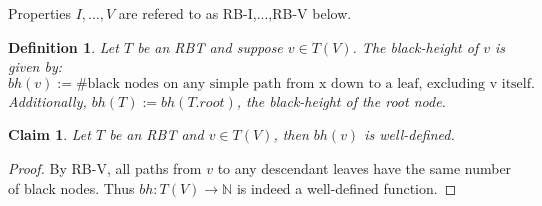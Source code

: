 \documentclass[10pt]{article}
\newtheorem{definition}{Definition}[section]
\newtheorem{claim}{Claim}[section]
\begin{document}
Properties $I,\ldots, V$ are refered to as RB-I,...,RB-V below.

\begin{definition}
  Let $T$ be an RBT and suppose $v \in T(V)$. The \emph{black-height} of
  $v$ is given by:
    \[ bh(v) := \#\text{black nodes on any simple path from x down to a leaf,
      excluding v itself.} \]
  Additionally, $bh(T) := bh(T.root)$, the black-height of the root node.
\end{definition}

\begin{claim}
  Let $T$ be an RBT and $v \in T(V)$, then $bh(v)$ is \emph{well-defined}.
\end{claim}

\begin{proof}
  By RB-V, all paths from $v$ to any descendant leaves
  have the same number of black nodes.
  Thus $bh : T(V) \rightarrow \mathbb{N}$ is indeed a well-defined function.
\end{proof}
\end{document}
